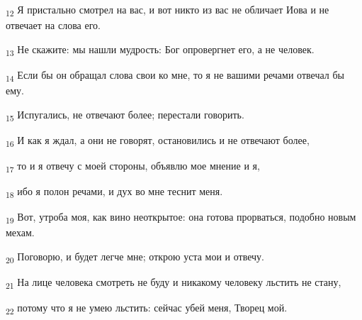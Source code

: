 \begin{tcolorbox}
\textsubscript{12} Я пристально смотрел на вас, и вот никто из вас не обличает Иова и не отвечает на слова его.
\end{tcolorbox}
\begin{tcolorbox}
\textsubscript{13} Не скажите: мы нашли мудрость: Бог опровергнет его, а не человек.
\end{tcolorbox}
\begin{tcolorbox}
\textsubscript{14} Если бы он обращал слова свои ко мне, то я не вашими речами отвечал бы ему.
\end{tcolorbox}
\begin{tcolorbox}
\textsubscript{15} Испугались, не отвечают более; перестали говорить.
\end{tcolorbox}
\begin{tcolorbox}
\textsubscript{16} И как я ждал, а они не говорят, остановились и не отвечают более,
\end{tcolorbox}
\begin{tcolorbox}
\textsubscript{17} то и я отвечу с моей стороны, объявлю мое мнение и я,
\end{tcolorbox}
\begin{tcolorbox}
\textsubscript{18} ибо я полон речами, и дух во мне теснит меня.
\end{tcolorbox}
\begin{tcolorbox}
\textsubscript{19} Вот, утроба моя, как вино неоткрытое: она готова прорваться, подобно новым мехам.
\end{tcolorbox}
\begin{tcolorbox}
\textsubscript{20} Поговорю, и будет легче мне; открою уста мои и отвечу.
\end{tcolorbox}
\begin{tcolorbox}
\textsubscript{21} На лице человека смотреть не буду и никакому человеку льстить не стану,
\end{tcolorbox}
\begin{tcolorbox}
\textsubscript{22} потому что я не умею льстить: сейчас убей меня, Творец мой.
\end{tcolorbox}

